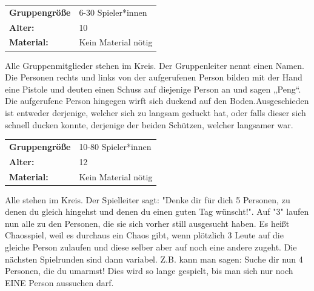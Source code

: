 \begin{table}[H]
\begin{tabular}{>{\bfseries}lp{8cm}}
   Gruppengröße   & 6-30 Spieler*innen\\
    Alter: & 10 \\
    Material: & Kein Material nötig\\
\end{tabular}
\end{table} 
Alle Gruppenmitglieder stehen im Kreis. Der Gruppenleiter nennt einen Namen. Die Personen rechts und links von der aufgerufenen Person bilden mit der Hand eine Pistole und deuten einen Schuss auf diejenige Person an und sagen „Peng“. Die aufgerufene Person hingegen wirft sich duckend auf den Boden.Ausgeschieden ist entweder derjenige, welcher sich zu langsam geduckt hat, oder falls dieser sich schnell ducken konnte, derjenige der beiden Schützen, welcher langsamer war. \\




\begin{table}[H]
\begin{tabular}{>{\bfseries}lp{8cm}}
   Gruppengröße   & 10-80 Spieler*innen\\
    Alter: & 12 \\
    Material: & Kein Material nötig\\ 
\end{tabular}
\end{table} 
Alle stehen im Kreis. Der Spielleiter sagt: "Denke dir für dich 5 Personen, zu denen du gleich hingehst und denen du einen guten Tag wünscht!". Auf "3" laufen nun alle zu den Personen, die sie sich vorher still ausgesucht haben. Es heißt Chaosspiel, weil es durchaus ein Chaos gibt, wenn plötzlich 3 Leute auf die gleiche Person zulaufen und diese selber aber auf noch eine andere zugeht. Die nächsten Spielrunden sind dann variabel. Z.B. kann man sagen: Suche dir nun 4 Personen, die du umarmst! Dies wird so lange gespielt, bis man sich nur noch EINE Person aussuchen darf.\\


